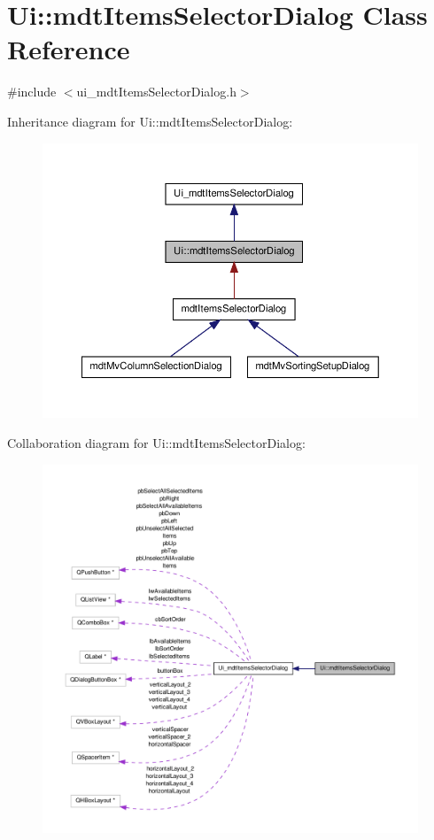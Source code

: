 \hypertarget{class_ui_1_1mdt_items_selector_dialog}{\section{Ui\-:\-:mdt\-Items\-Selector\-Dialog Class Reference}
\label{class_ui_1_1mdt_items_selector_dialog}
}


{\ttfamily \#include $<$ui\-\_\-mdt\-Items\-Selector\-Dialog.\-h$>$}



Inheritance diagram for Ui\-:\-:mdt\-Items\-Selector\-Dialog\-:
\nopagebreak
\begin{figure}[H]
\begin{center}
\leavevmode
\includegraphics[width=350pt]{class_ui_1_1mdt_items_selector_dialog__inherit__graph}
\end{center}
\end{figure}


Collaboration diagram for Ui\-:\-:mdt\-Items\-Selector\-Dialog\-:
\nopagebreak
\begin{figure}[H]
\begin{center}
\leavevmode
\includegraphics[width=350pt]{class_ui_1_1mdt_items_selector_dialog__coll__graph}
\end{center}
\end{figure}
